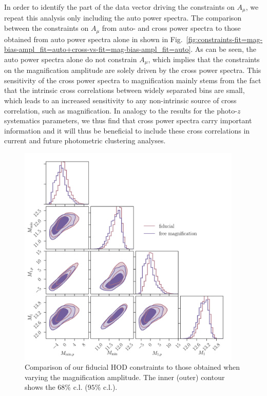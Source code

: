 \documentclass[a4paper,11pt]{article}
\begin{document}
    In order to identify the part of the data vector driving the constraints on $A_{\mu}$, we repeat this analysis only including the auto power spectra. The comparison between the constraints on $A_{\mu}$ from auto- and cross power spectra to those obtained from auto power spectra alone in shown in Fig.~\ref{fig:constraints-fit=mag-bias-ampl_fit=auto+cross-vs-fit=mag-bias-ampl_fit=auto}. As can be seen, the auto power spectra alone do not constrain $A_{\mu}$, which implies that the constraints on the magnification amplitude are solely driven by the cross power spectra. This sensitivity of the cross power spectra to magnification mainly stems from the fact that the intrinsic cross correlations between widely separated bins are small, which leads to an increased sensitivity to any non-intrinsic source of cross correlation, such as magnification. In analogy to the results for the photo-$z$ systematics parameters, we thus find that cross power spectra carry important information and it will thus be beneficial to include these cross correlations in current and future photometric clustering analyses. 

    \begin{figure}
      \begin{center}
        \includegraphics[width=0.95\textwidth]{figures/contours-Mmin-M1_mPk=HOD_fix=alpha-fc-sigmaM_HOD=zevol_fit=pz-shifts+prior=0p2-pz-widths+prior=0p2_fit=auto+cross_cosmo=const-LINBIAS_HOD-param=zfid_clfit=HOD-zevol_no-mag-bias-vs-mag-bias-free.pdf}
        \caption{Comparison of our fiducial HOD constraints to those obtained when varying the magnification amplitude. The inner (outer) contour shows the $68 \%$ c.l. ($95 \%$ c.l.).}
        \label{fig:constraints-no-mag-bias-vs-fit=mag-bias-ampl}
      \end{center}
    \end{figure}
\end{document}
